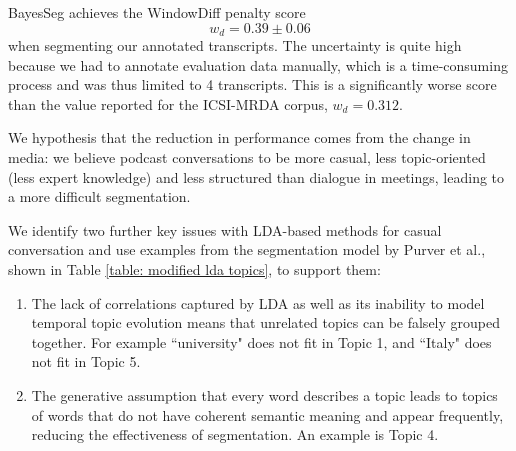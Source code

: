     BayesSeg achieves the WindowDiff penalty score
    \begin{equation}
     w_d = 0.39 \pm 0.06
    \end{equation} 
    when segmenting our annotated transcripts. The uncertainty is quite high because we had to annotate evaluation data manually, which is a time-consuming process and was thus limited to 4 transcripts. This is a significantly worse score than the value reported for the ICSI-MRDA corpus, $w_d = 0.312$\cite{eisenstein2008bayesian}.
    
    We hypothesis that the reduction in performance comes from the change in media: we believe podcast conversations to be more casual, less topic-oriented (less expert knowledge) and less structured than dialogue in meetings, leading to a more difficult segmentation.
    
    
      We identify two further key issues with LDA-based methods for casual conversation and use examples from the segmentation model by Purver et al., shown in Table \ref{table: modified lda topics}, to support them:
    \begin{enumerate}
        \item The lack of correlations captured by LDA as well as its inability to model temporal topic evolution means that unrelated topics can be falsely grouped together. For example ``university" does not fit in Topic 1, and ``Italy" does not fit in Topic 5.
        \item The generative assumption that every word describes a topic leads to topics of words that do not have coherent semantic meaning and appear frequently, reducing the effectiveness of segmentation. An example is Topic 4.
    \end{enumerate}
    
    
